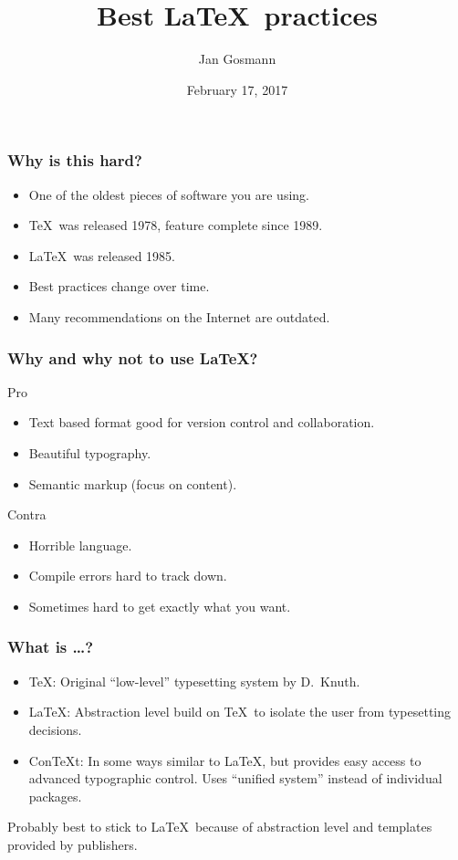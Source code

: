 \documentclass{beamer}
\title{Best \LaTeX\ practices}
\author{Jan Gosmann}
\date{February 17, 2017}
\begin{document}
\maketitle

\begin{frame}
    \frametitle{Why is this hard?}
    \begin{itemize}
        \item One of the oldest pieces of software you are using.
        \item \TeX\ was released 1978, feature complete since 1989.
        \item \LaTeX\ was released 1985.
        \item Best practices change over time.
        \item Many recommendations on the Internet are outdated.
    \end{itemize}
\end{frame}

\begin{frame}
    \frametitle{Why and why not to use \LaTeX?}
    \begin{block}{Pro}
        \begin{itemize}
            \item Text based format good for version control and collaboration.
            \item Beautiful typography.
            \item Semantic markup (focus on content).
        \end{itemize}
    \end{block}
    \begin{block}{Contra}
        \begin{itemize}
            \item Horrible language.
            \item Compile errors hard to track down.
            \item Sometimes hard to get exactly what you want.
        \end{itemize}
    \end{block}
\end{frame}

\begin{frame}
    \frametitle{What is \dots?}
    \begin{itemize}
        \item \TeX\@: Original ``low-level'' typesetting system by D.~Knuth.
        \item \LaTeX\@: Abstraction level build on \TeX\ to isolate the user from typesetting decisions.
        \item ConTeXt\@: In some ways similar to \LaTeX, but provides easy access to advanced typographic control. Uses ``unified system'' instead of individual packages.
    \end{itemize}
    Probably best to stick to \LaTeX\ because of abstraction level and templates provided by publishers.
\end{frame}
\end{document}

